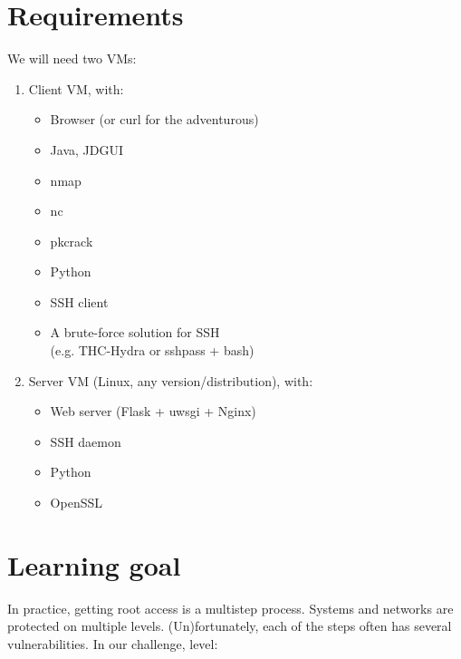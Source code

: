 \documentclass[11pt, a4paper]{article}
\begin{document}
\section{Requirements}

We will need two VMs:

\begin{enumerate}
  \item Client VM, with:
  \vspace{-0.5em}
  \begin{multicols}{2}
	\begin{itemize}
		\setlength\itemsep{-0.2em}
		\item Browser (or curl for the adventurous)
  		\item Java, JDGUI
  		\item nmap
  		\item nc
		\item pkcrack
  		\item Python
  		\item SSH client
  		\item A brute-force solution for SSH\\ (e.g. \mbox{THC-Hydra} or sshpass + bash)
	\end{itemize}
\end{multicols}

  \item Server VM (Linux, any version/distribution), with:
    \vspace{-0.5em}
  \begin{multicols}{2}
        \begin{itemize}
		\setlength\itemsep{-0.2em}
          \item Web server (Flask + uwsgi + Nginx)
          \item SSH daemon
          \item Python
          \item OpenSSL
        \end{itemize}
        \end{multicols}
\end{enumerate}



\section{Learning goal}

In practice, getting root access is a multistep process. Systems and
networks are protected on multiple levels. (Un)fortunately, each of the
steps often has several vulnerabilities. In our challenge, level:
\end{document}
